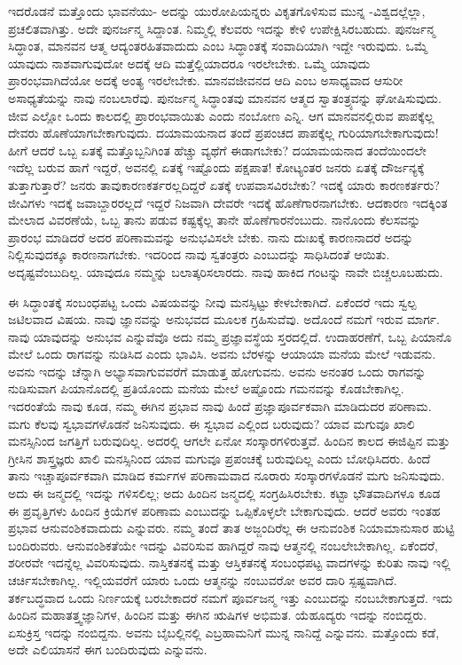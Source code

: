 ಇದರೊಡನೆ ಮತ್ತೊಂದು ಭಾವನೆಯು- ಅದನ್ನು ಯುರೋಪಿಯನ್ನರು ವಿಕೃತಗೊಳಿಸುವ ಮುನ್ನ -ವಿಶ್ವದಲ್ಲೆಲ್ಲಾ, ಪ್ರಚಲಿತವಾಗಿತ್ತು. ಅದೇ ಪುನರ್ಜನ್ಮ ಸಿದ್ದಾಂತ. ನಿಮ್ಮಲ್ಲಿ ಕೆಲವರು ಇದನ್ನು ಕೇಳಿ ಉಪೇಕ್ಷಿಸಿರಬಹುದು. ಪುನರ್ಜನ್ಮ ಸಿದ್ಧಾಂತ, ಮಾನವನ ಆತ್ಮ ಆದ್ಯಂತರಹಿತವಾದುದು ಎಂಬ ಸಿದ್ಧಾಂತಕ್ಕೆ ಸಂವಾದಿಯಾಗಿ ಇದ್ದೇ ಇರುವುದು. ಒಮ್ಮೆ ಯಾವುದು ನಾಶವಾಗುವುದೋ ಅದಕ್ಕೆ ಆದಿ ಮತ್ತೆಲ್ಲಿಯಾದರೂ ಇರಲೇಬೇಕು. ಒಮ್ಮೆ ಯಾವುದು ಪ್ರಾರಂಭವಾಗಿದೆಯೋ ಅದಕ್ಕೆ ಅಂತ್ಯ ಇರಲೇಬೇಕು. ಮಾನವಜೀವನದ ಆದಿ ಎಂಬ ಅಸಾಧ್ಯವಾದ ಆಸುರೀ ಅಸಾಧ್ಯತೆಯನ್ನು ನಾವು ನಂಬಲಾರೆವು. ಪುನರ್ಜನ್ಮ ಸಿದ್ಧಾಂತವು ಮಾನವನ ಆತ್ಮದ ಸ್ವಾತಂತ್ರ್ಯವನ್ನು ಘೋಷಿಸುವುದು. ಜೀವ ಎಲ್ಲೋ ಒಂದು ಕಾಲದಲ್ಲಿ ಪ್ರಾರಂಭವಾಯಿತು ಎಂದು ನಂಬೋಣ ಎನ್ನಿ. ಆಗ ಮಾನವನಲ್ಲಿರುವ ಪಾಪಕ್ಕೆಲ್ಲ ದೇವರು ಹೊಣೆಯಾಗಬೇಕಾಗುವುದು. ದಯಾಮಯನಾದ ತಂದೆ ಪ್ರಪಂಚದ ಪಾಪಕ್ಕೆಲ್ಲ ಗುರಿಯಾಗಬೇಕಾಗುವುದು! ಹೀಗೆ ಆದರೆ ಒಬ್ಬ ಏತಕ್ಕೆ ಮತ್ತೊಬ್ಬನಿಗಿಂತ ಹೆಚ್ಚು ವ್ಯಥೆಗೆ ಈಡಾಗಬೇಕು? ದಯಾಮಯನಾದ ತಂದೆಯಿಂದಲೇ ಇದೆಲ್ಲ ಬರುವ ಹಾಗೆ ಇದ್ದರೆ, ಅವನಲ್ಲಿ ಏತಕ್ಕೆ ಇಷ್ಟೊಂದು ಪಕ್ಷಪಾತ! ಕೋಟ್ಯಂತರ ಜನರು ಏತಕ್ಕೆ ದೌರ್ಜನ್ಯಕ್ಕೆ ತುತ್ತಾಗುತ್ತಾರೆ? ಜನರು ತಾವು\break ಕಾರಣಕರ್ತರಲ್ಲದಿದ್ದರೆ ಏತಕ್ಕೆ ಉಪವಾಸವಿರಬೇಕು? ಇದಕ್ಕೆ ಯಾರು ಕಾರಣಕರ್ತರು? ಜೀವಿಗಳು ಇದಕ್ಕೆ ಜವಾಬ್ದಾರರಲ್ಲದೆ ಇದ್ದರೆ ನಿಜವಾಗಿ ದೇವರೇ ಇದಕ್ಕೆ ಹೊಣೆಗಾರನಾಗಬೇಕು. ಆದಕಾರಣ ಇದಕ್ಕಿಂತ ಮೇಲಾದ ವಿವರಣೆಯೆ, ಒಬ್ಬ ತಾನು ಪಡುವ ಕಷ್ಟಕ್ಕೆಲ್ಲ ತಾನೇ ಹೊಣೆಗಾರನೆಂಬುದು. ನಾನೊಂದು ಕೆಲಸವನ್ನು ಪ್ರಾರಂಭ ಮಾಡಿದರೆ ಅದರ ಪರಿಣಾಮವನ್ನು ಅನುಭವಿಸಲೇ ಬೇಕು. ನಾನು ದುಃಖಕ್ಕೆ ಕಾರಣನಾದರೆ ಅದನ್ನು ನಿಲ್ಲಿಸುವುದಕ್ಕೂ ಕಾರಣನಾಗಬೇಕು. ಇದರಿಂದ ನಾವು ಸ್ವತಂತ್ರರು ಎಂಬುದನ್ನು ಸಾಧಿಸಿದಂತೆ ಆಯಿತು. ಅದೃಷ್ಟವೆಂಬುದಿಲ್ಲ. ಯಾವುದೂ ನಮ್ಮನ್ನು ಬಲಾತ್ಕರಿಸಲಾರದು. ನಾವು ಹಾಕಿದ ಗಂಟನ್ನು ನಾವೇ ಬಿಚ್ಚಲೂಬಹುದು.

ಈ ಸಿದ್ಧಾಂತಕ್ಕೆ ಸಂಬಂಧಪಟ್ಟ ಒಂದು ವಿಷಯವನ್ನು ನೀವು ಮನಸ್ಸಿಟ್ಟು ಕೇಳಬೇಕಾಗಿದೆ. ಏಕೆಂದರೆ ಇದು ಸ್ವಲ್ಪ ಜಟಿಲವಾದ ವಿಷಯ. ನಾವು ಜ್ಞಾನವನ್ನು ಅನುಭವದ ಮೂಲಕ ಗ್ರಹಿಸುವೆವು. ಅದೊಂದೆ ನಮಗೆ ಇರುವ ಮಾರ್ಗ. ನಾವು ಯಾವುದನ್ನು ಅನುಭವ ಎನ್ನುವೆವೊ ಅದು ನಮ್ಮ ಪ್ರಜ್ಞಾವಸ್ಥೆಯ ಸ್ತರದಲ್ಲಿದೆ. ಉದಾಹರಣೆಗೆ, ಒಬ್ಬ ಪಿಯಾನೊ ಮೇಲೆ ಒಂದು ರಾಗವನ್ನು ನುಡಿಸಿದ ಎಂದು ಭಾವಿಸಿ. ಅವನು ಬೆರಳನ್ನು ಆಯಾಯಾ ಮನೆಯ ಮೇಲೆ ಇಡುವನು. ಅವನು ಇದನ್ನು ಚೆನ್ನಾಗಿ ಅಭ್ಯಾಸವಾಗುವವರೆಗೆ ಮಾಡುತ್ತ ಹೋಗುವನು. ಅವನು ಅನಂತರ ಒಂದು ರಾಗವನ್ನು ನುಡಿಸುವಾಗ ಪಿಯಾನೊದಲ್ಲಿ ಪ್ರತಿಯೊಂದು ಮನೆಯ ಮೇಲೆ ಅಷ್ಟೊಂದು ಗಮನವನ್ನು ಕೊಡಬೇಕಾಗಿಲ್ಲ. ಇದರಂತೆಯೆ ನಾವು ಕೂಡ, ನಮ್ಮ ಈಗಿನ ಪ್ರಭಾವ ನಾವು ಹಿಂದೆ ಪ್ರಜ್ಞಾಪೂರ್ವಕವಾಗಿ ಮಾಡಿದುದರ ಪರಿಣಾಮ. ಮಗು ಕೆಲವು ಸ್ವಭಾವಗಳೊಡನೆ ಜನಿಸುವುದು. ಈ ಸ್ವಭಾವ ಎಲ್ಲಿಂದ ಬರುವುದು? ಯಾವ ಮಗುವೂ ಖಾಲಿ ಮನಸ್ಸಿನಿಂದ ಜಗತ್ತಿಗೆ ಬರುವುದಿಲ್ಲ. ಅದರಲ್ಲಿ ಆಗಲೇ ಏನೋ ಸಂಸ್ಕಾರಗಳಿರುತ್ತವೆ. ಹಿಂದಿನ ಕಾಲದ ಈಜಿಪ್ಟಿನ ಮತ್ತು ಗ್ರೀಸಿನ ಶಾಸ್ತ್ರಜ್ಞರು ಖಾಲಿ ಮನಸ್ಸಿನಿಂದ ಯಾವ ಮಗುವೂ ಪ್ರಪಂಚಕ್ಕೆ ಬರುವುದಿಲ್ಲ ಎಂದು ಬೋಧಿಸಿದರು. ಹಿಂದೆ ತಾನು ಇಚ್ಚಾಪೂರ್ವಕವಾಗಿ ಮಾಡಿದ ಕರ್ಮಗಳ ಪರಿಣಾಮವಾದ ನೂರಾರು ಸಂಸ್ಕಾರಗಳೊಡನೆ ಮಗು ಜನಿಸುವುದು. ಅದು ಈ ಜನ್ಮದಲ್ಲಿ ಇದನ್ನು ಗಳಿಸಲಿಲ್ಲ; ಅದು ಹಿಂದಿನ ಜನ್ಮದಲ್ಲಿ ಸಂಗ್ರಹಿಸಿರಬೇಕು. ಕಟ್ಟಾ ಭೌತವಾದಿಗಳೂ ಕೂಡ ಈ ಪ್ರವೃತ್ತಿಗಳು ಹಿಂದಿನ ಕ್ರಿಯೆಗಳ ಪರಿಣಾಮ ಎಂಬುದನ್ನು ಒಪ್ಪಿಕೊಳ್ಳಲೇ ಬೇಕಾಗುವುದು. ಆದರೆ ಅವರು ಇಂತಹ ಪ್ರಭಾವ ಆನುವಂಶಿಕವಾದುದು ಎನ್ನುವರು. ನಮ್ಮ ತಂದೆ ತಾತ ಅಜ್ಜಂದಿರೆಲ್ಲ ಈ ಆನುವಂಶಿಕ ನಿಯಾಮಾನುಸಾರ ಹುಟ್ಟಿ ಬಂದಿರುವರು. ಆನುವಂಶಿಕತೆಯೇ ಇದನ್ನು ವಿವರಿಸುವ ಹಾಗಿದ್ದರೆ ನಾವು ಆತ್ಮನಲ್ಲಿ ನಂಬಲೇಬೇಕಾಗಿಲ್ಲ. ಏಕೆಂದರೆ, ಶರೀರವೇ ಇದನ್ನೆಲ್ಲ ವಿವರಿಸುವುದು. ನಾಸ್ತಿಕತನಕ್ಕೆ ಮತ್ತು ಆಸ್ತಿಕತನಕ್ಕೆ ಸಂಬಂಧಪಟ್ಟ ವಾದಗಳನ್ನು ಕುರಿತು ನಾವು ಇಲ್ಲಿ ಚರ್ಚಿಸಬೇಕಾಗಿಲ್ಲ. ಇಲ್ಲಿಯವರೆಗೆ ಯಾರು ಒಂದು ಆತ್ಮನನ್ನು ನಂಬುವರೋ ಅವರ ದಾರಿ ಸ್ಪಷ್ಟವಾಗಿದೆ. ತರ್ಕಬದ್ಧವಾದ ಒಂದು ನಿರ್ಣಯಕ್ಕೆ ಬರಬೇಕಾದರೆ ನಮಗೆ ಪೂರ್ವಜನ್ಮ ಇತ್ತು ಎಂಬುದನ್ನು ನಂಬಬೇಕಾಗುತ್ತದೆ. ಇದು ಹಿಂದಿನ ಮಹಾತತ್ತ್ವಜ್ಞಾನಿಗಳ, ಹಿಂದಿನ ಮತ್ತು ಈಗಿನ ಋಷಿಗಳ ಅಭಿಮತ. ಯೆಹೂದ್ಯರು ಇದನ್ನು ನಂಬಿದ್ದರು. ಏಸುಕ್ರಿಸ್ತ ಇದನ್ನು ನಂಬಿದ್ದನು. ಅವನು ಬೈಬಲ್ಲಿನಲ್ಲಿ ಎಬ್ರಹಾಮನಿಗೆ ಮುನ್ನ ನಾನಿದ್ದೆ ಎನ್ನುವನು. ಮತ್ತೊಂದು ಕಡೆ, ಅದೇ ಎಲಿಯಾಸನೆ ಈಗ ಬಂದಿರುವುದು ಎನ್ನುವನು.

